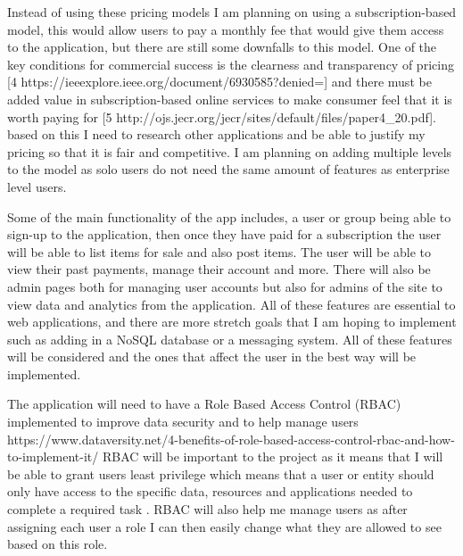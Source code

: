 \documentclass[]{project_report}
\begin{document}
Instead of using these pricing models I am planning on using a subscription-based model, this would allow users to pay a monthly fee that would give them access to the application, but there are still some downfalls to this model. One of the key conditions for commercial success is the clearness and transparency of pricing [4 https://ieeexplore.ieee.org/document/6930585?denied=] and there must be added value in subscription-based online services to make consumer feel that it is worth paying for [5 http://ojs.jecr.org/jecr/sites/default/files/paper4_20.pdf]. based on this I need to research other applications and be able to justify my pricing so that it is fair and competitive. I am planning on adding multiple levels to the model as solo users do not need the same amount of features as enterprise level users.

Some of the main functionality of the app includes, a user or group being able to sign-up to the application, then once they have paid for a subscription the user will be able to list items for sale and also post items. The user will be able to view their past payments, manage their account and more. There will also be admin pages both for managing user accounts but also for admins of the site to view data and analytics from the application. All of these features are essential to web applications, and there are more stretch goals that I am hoping to implement such as adding in a NoSQL database or a messaging system. All of these features will be considered and the ones that affect the user in the best way will be implemented.

The application will need to have a Role Based Access Control (RBAC) implemented to improve data security and to help manage users https://www.dataversity.net/4-benefits-of-role-based-access-control-rbac-and-how-to-implement-it/ RBAC will be important to the project as it means that I will be able to grant users least privilege which means that a user or entity should only have access to the specific data, resources and applications needed to complete a required task . RBAC will also help me manage users as after assigning each user a role I can then easily change what they are allowed to see based on this role. 
\end{document}
